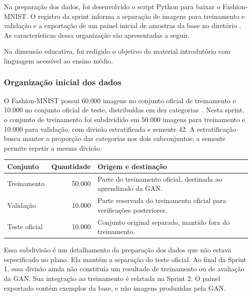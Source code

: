 \documentclass[12pt,a4paper]{article}
\begin{document}
Na preparação dos dados, foi desenvolvido o script Python  para baixar o Fashion-MNIST. O registro da sprint informa a separação de imagens para treinamento e validação e a exportação de um painel inicial de amostras da base no diretório . As características dessa organização são apresentadas a seguir.

Na dimensão educativa, foi redigido o objetivo do material introdutório com linguagem acessível ao ensino médio.

\subsubsection{Organização inicial dos dados}
\label{sec:dados}
O Fashion-MNIST possui 60.000 imagens no conjunto oficial de treinamento e 10.000 no conjunto oficial de teste, distribuídas em dez categorias~\cite{fashionmnist}. Nesta sprint, o conjunto de treinamento foi subdividido em 50.000 imagens para treinamento e 10.000 para validação, com divisão estratificada e semente 42. A estratificação busca manter a proporção das categorias nos dois subconjuntos; a semente permite repetir a mesma divisão.

\begin{center}
\small
\begin{tabularx}{\textwidth}{@{}YrY@{}}
\toprule
\textbf{Conjunto} & \textbf{Quantidade} & \textbf{Origem e destinação} \\
\midrule
Treinamento & 50.000 & Parte do treinamento oficial, destinada ao aprendizado da GAN. \\
Validação & 10.000 & Parte reservada do treinamento oficial para verificações posteriores. \\
Teste oficial & 10.000 & Conjunto original separado, mantido fora do treinamento. \\
\bottomrule
\end{tabularx}
\end{center}

Essa subdivisão é um detalhamento da preparação dos dados que não estava especificado no plano. Ela mantém a separação do teste oficial. Ao final da Sprint 1, essa divisão ainda não constituía um resultado de treinamento ou de avaliação da GAN. Sua integração ao treinamento é relatada na Sprint 2. O painel exportado contém exemplos da base, e não imagens produzidas pela GAN.
\end{document}
